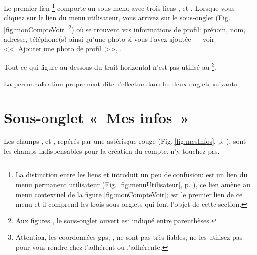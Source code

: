 Le premier lien 
\footnote{La distinction entre les liens  et  introduit un peu de confusion:  est un lien du menu permanent utilisateur (Fig. \ref{fig:menuUtilisateur}, p. \pageref{fig:menuUtilisateur}), ce lien amène au menu contextuel de la figure \vref{fig:monCompteVoir};  est le premier lien de ce menu et il comprend les trois sous-onglets qui font l'objet de cette section.}
comporte un sous-menu avec trois liens ,  et . Lorsque vous cliquez sur le lien  du menu utilisateur, vous arrivez sur le sous-onglet  (Fig. \ref{fig:monCompteVoir}%
\footnote{Aux figures , le sous-onglet ouvert est indiqué entre parenthèses.})
où se trouvent vos informations de profil: prénom, nom, adresse, téléphone(s) ainsi qu'une photo si vous l'avez ajoutée --- voir <<~Ajouter une photo de profil~>>, .

Tout ce qui figure au-dessous du trait horizontal n’est pas utilisé au \CdS
\footnote{Attention, les coordonnées gps, , ne sont pas très fiables, ne les utilisez pas pour vous rendre chez l'adhérent ou l'adhérente.}.

La personnalisation proprement dite s’effectue dans les deux onglets suivants.

\section{Sous-onglet «~Mes infos~»}
\label{page:completerInfosPerso}

Les champs ,  et , repérés par une astérisque rouge (Fig. \ref{fig:mesInfos}, p. \pageref{fig:mesInfos}), sont les champs indispensables pour la création du compte, n’y touchez pas.


